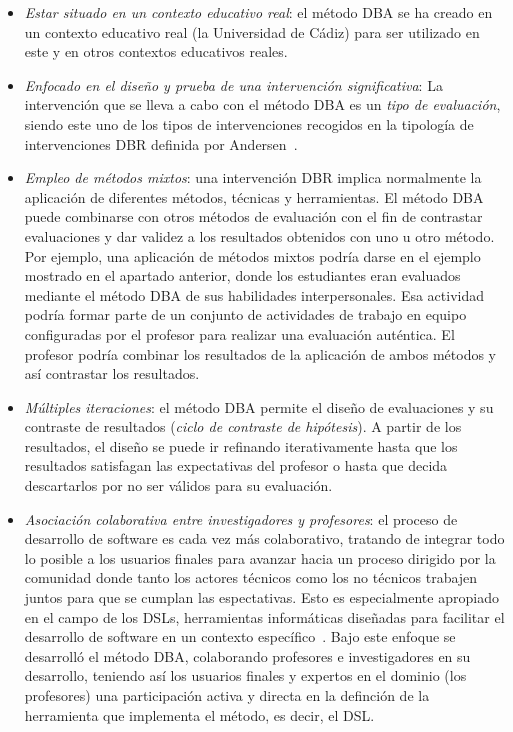 \begin{itemize}
\item \emph{Estar situado en un contexto educativo real}: el método DBA se ha creado en un contexto educativo real (la Universidad de Cádiz) para ser utilizado en este y en otros contextos educativos reales.
\item \emph{Enfocado en el diseño y prueba de una intervención significativa}: La intervención que se lleva a cabo con el método DBA es un \emph{tipo de evaluación}, siendo este uno de los tipos de intervenciones recogidos en la tipología de intervenciones DBR definida por Andersen~\cite{anderson2012design}. 
\item \emph{Empleo de métodos mixtos}: una intervención DBR implica normalmente la aplicación de diferentes métodos, técnicas y herramientas. El método DBA puede combinarse con otros métodos de evaluación con el fin de contrastar evaluaciones y dar validez a los resultados obtenidos con uno u otro método. Por ejemplo, una aplicación de métodos mixtos podría darse en el ejemplo mostrado en el apartado anterior, donde los estudiantes eran evaluados mediante el método DBA de sus habilidades interpersonales. Esa actividad podría formar parte de un conjunto de actividades de trabajo en equipo configuradas por el profesor para realizar una evaluación auténtica. El profesor podría combinar los resultados de la aplicación de ambos métodos y así contrastar los resultados.
\item \emph{Múltiples iteraciones}: el método DBA permite el diseño de evaluaciones y su contraste de resultados (\emph{ciclo de contraste de hipótesis}). A partir de los resultados, el diseño se puede ir refinando iterativamente hasta que los resultados satisfagan las expectativas del profesor o hasta que decida descartarlos por no ser válidos para su evaluación.
\item \emph{Asociación colaborativa entre investigadores y profesores}: el proceso de desarrollo de software es cada vez más colaborativo, tratando de integrar todo lo posible a los usuarios finales para avanzar hacia un proceso dirigido por la comunidad donde tanto los actores técnicos como los no técnicos trabajen juntos para que se cumplan las espectativas. Esto es especialmente apropiado en el campo de los DSLs, herramientas informáticas diseñadas para facilitar el desarrollo de software en un contexto específico~\cite{izquierdo2012community}. Bajo este enfoque se desarrolló el método DBA, colaborando profesores e investigadores en su desarrollo, teniendo así los usuarios finales y expertos en el dominio (los profesores) una participación activa y directa en la definción de la herramienta que implementa el método, es decir, el DSL. 

\end{itemize}
